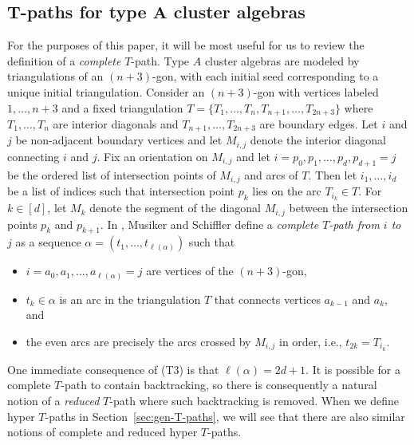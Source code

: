 \documentclass[10pt,a4paper]{amsart}
\numberwithin{equation}{section}
\newcommand{\new}[1]{{#1}}
\begin{document}
\subsection[T-paths for type A cluster algebras]{$\boldsymbol{T}$-paths for type $\boldsymbol{A}$ cluster algebras}\label{sec:T-path-bg}
For the purposes of this paper, it will be most useful for us to review the definition of a \emph{complete} $T$-path.
Type $A$ cluster algebras are modeled by triangulations of an $(n+3)$-gon, with each initial seed corresponding to a unique initial triangulation. Consider an $(n+3)$-gon with vertices labeled $1, \dots, n+3$ and a fixed triangulation $T = \{ T_1, \dots, T_n, T_{n+1}, \dots, T_{2n+3} \}$ where $T_1, \dots, T_n$ are interior diagonals and $T_{n+1},\dots, T_{2n+3}$ are boundary edges. Let $i$ and $j$ be non-adjacent boundary vertices and let $M_{i,j}$ denote the interior diagonal connecting $i$ and $j$. Fix an orientation on $M_{i,j}$ and let $i = p_0, p_1, \dots, p_{d}, p_{d+1} = j$ be the ordered list of intersection points of $M_{i,j}$ and arcs of $T$. Then let $i_1, \dots, i_{d}$ be a list of indices such that intersection point $p_k$ lies on the arc $T_{i_k} \in T$.
For $k \in [d]$, let $M_k$ denote the segment of the diagonal $M_{i,j}$ between the intersection points $p_k$ and $p_{k+1}$.
In \cite{MS-09}, Musiker and Schiffler define a \emph{complete $T$-path from $i$ to $j$} as a sequence $\alpha = ( t_1,\dots,t_{\ell(\alpha)})$ such that
\begin{itemize}\itemsep=0pt
 \item[(T1)] $i = a_0,a_1, \dots,a_{\ell(\alpha)} = j$ are vertices of the $(n+3)$-gon,
 \item[(T2)] $t_k \in \alpha$ is an arc in the triangulation $T$ that connects vertices $a_{k-1}$ and $a_k$, and
 \item[(T3)] the even arcs are precisely the arcs crossed by $M_{i,j}$ in order, i.e., $t_{2k} = T_{i_k}$.
\end{itemize}
One immediate consequence of (T3) is that
\new{$\ell(\alpha)=2d+1$}.
It is possible for a complete $T$-path to contain backtracking, so there is consequently a natural notion of a \emph{reduced} $T$-path where such backtracking is removed. When we define hyper $T$-paths in Section~\ref{sec:gen-T-paths}, we will see that there are also similar notions of complete and reduced hyper $T$-paths.
\end{document}
